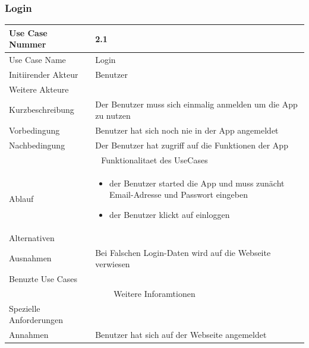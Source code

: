 \documentclass[10pt,a4paper]{article}
\begin{document}
\subsubsection{Login}
		\begin{tabular}{|l|p{.5\linewidth}|}
		\hline Use Case Nummer & 2.1 \\ 
		\hline Use Case Name & Login \\ 
		\hline Initiirender Akteur & Benutzer \\
		\hline Weitere Akteure &  \\
		\hline Kurzbeschreibung & Der Benutzer muss sich einmalig anmelden um die App zu nutzen \\
		\hline Vorbedingung & Benutzer hat sich noch nie in der App angemeldet \\
		\hline Nachbedingung & Der Benutzer hat zugriff auf die Funktionen der App \\
		\hline \multicolumn{2}{|c|}{Funktionalitaet des UseCases}\\
		\hline Ablauf & \begin{itemize}
			\item der Benutzer started die App und muss zun\"acht Email-Adresse und Passwort eingeben
			\item der Benutzer klickt auf einloggen
		\end{itemize} \\
		\hline Alternativen &  \\
		\hline Ausnahmen & Bei Falschen Login-Daten wird auf die Webseite verwiesen \\
		\hline Benuzte Use Cases &  \\
		\hline \multicolumn{2}{|c|}{Weitere Inforamtionen} \\
		\hline Spezielle Anforderungen &  \\
		\hline Annahmen & Benutzer hat sich auf der Webseite angemeldet \\
		\hline
		\end{tabular}
\end{document}

